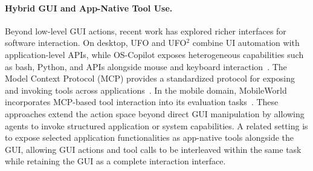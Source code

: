 \paragraph{Hybrid GUI and App-Native Tool Use.}
Beyond low-level GUI actions, recent work has explored richer interfaces for software interaction. On desktop, UFO and UFO$^2$ combine UI automation with application-level APIs, while OS-Copilot exposes heterogeneous capabilities such as bash, Python, and APIs alongside mouse and keyboard interaction~\citep{zhang2024ufo,zhang2025ufo2,wu2024oscopilot}. The Model Context Protocol (MCP) provides a standardized protocol for exposing and invoking tools across applications~\citep{anthropic2024mcp}. In the mobile domain, MobileWorld incorporates MCP-based tool interaction into its evaluation tasks~\citep{kong2025mobileworld}. These approaches extend the action space beyond direct GUI manipulation by allowing agents to invoke structured application or system capabilities. A related setting is to expose selected application functionalities as app-native tools alongside the GUI, allowing GUI actions and tool calls to be interleaved within the same task while retaining the GUI as a complete interaction interface.

